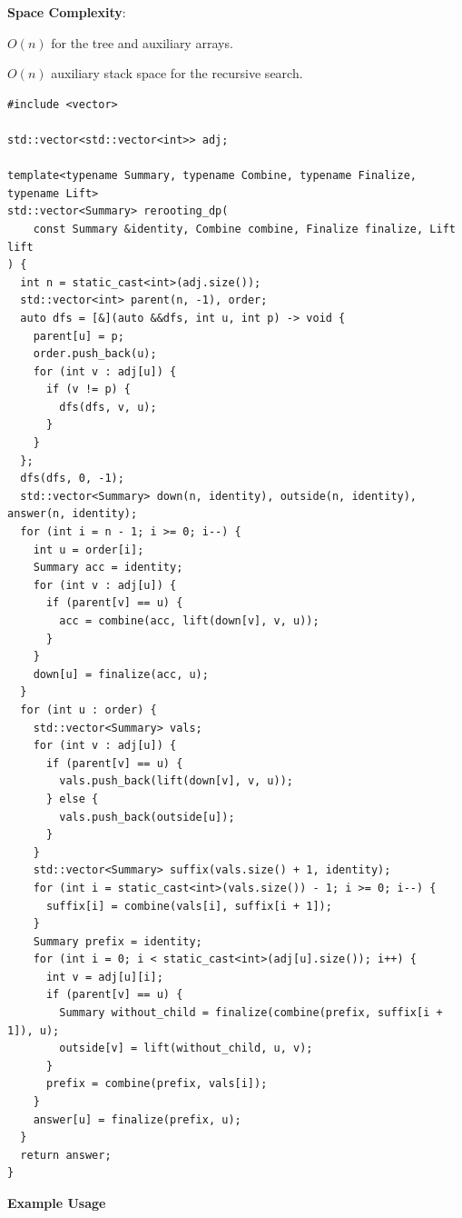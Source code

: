 \textbf{Space Complexity}:
\begin{compactitem}
  \item $O(n)$ for the tree and auxiliary arrays.
  \item $O(n)$ auxiliary stack space for the recursive search.
\end{compactitem}

\begin{lstlisting}[style=cpp]
#include <vector>

std::vector<std::vector<int>> adj;

template<typename Summary, typename Combine, typename Finalize, typename Lift>
std::vector<Summary> rerooting_dp(
    const Summary &identity, Combine combine, Finalize finalize, Lift lift
) {
  int n = static_cast<int>(adj.size());
  std::vector<int> parent(n, -1), order;
  auto dfs = [&](auto &&dfs, int u, int p) -> void {
    parent[u] = p;
    order.push_back(u);
    for (int v : adj[u]) {
      if (v != p) {
        dfs(dfs, v, u);
      }
    }
  };
  dfs(dfs, 0, -1);
  std::vector<Summary> down(n, identity), outside(n, identity), answer(n, identity);
  for (int i = n - 1; i >= 0; i--) {
    int u = order[i];
    Summary acc = identity;
    for (int v : adj[u]) {
      if (parent[v] == u) {
        acc = combine(acc, lift(down[v], v, u));
      }
    }
    down[u] = finalize(acc, u);
  }
  for (int u : order) {
    std::vector<Summary> vals;
    for (int v : adj[u]) {
      if (parent[v] == u) {
        vals.push_back(lift(down[v], v, u));
      } else {
        vals.push_back(outside[u]);
      }
    }
    std::vector<Summary> suffix(vals.size() + 1, identity);
    for (int i = static_cast<int>(vals.size()) - 1; i >= 0; i--) {
      suffix[i] = combine(vals[i], suffix[i + 1]);
    }
    Summary prefix = identity;
    for (int i = 0; i < static_cast<int>(adj[u].size()); i++) {
      int v = adj[u][i];
      if (parent[v] == u) {
        Summary without_child = finalize(combine(prefix, suffix[i + 1]), u);
        outside[v] = lift(without_child, u, v);
      }
      prefix = combine(prefix, vals[i]);
    }
    answer[u] = finalize(prefix, u);
  }
  return answer;
}
\end{lstlisting}
\textbf{Example Usage}\par
